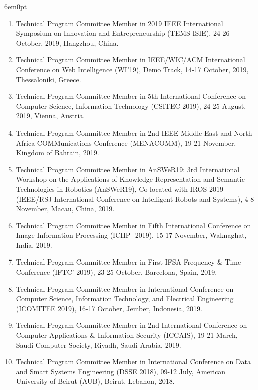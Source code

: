 \documentclass[11pt,a4paper]{moderncv}
\begin{document}
\begin{adjustwidth}{6em}{0pt}
\begin{enumerate}
		\item Technical Program Committee Member in 2019 IEEE International Symposium on Innovation and Entrepreneurship (TEMS-ISIE), 24-26 October, 2019, Hangzhou, China.
		
		\item Technical Program Committee Member in IEEE/WIC/ACM International Conference on Web Intelligence (WI'19), Demo Track, 14-17 October, 2019, Thessaloniki, Greece.
		
		\item Technical Program Committee Member in 5th International Conference on Computer Science, Information Technology (CSITEC 2019), 24-25 August, 2019, Vienna, Austria.
		
		\item Technical Program Committee Member in 2nd IEEE Middle East and North Africa COMMunications Conference (MENACOMM), 19-21 November, Kingdom of Bahrain, 2019.
		
		\item Technical Program Committee Member in AnSWeR19: 3rd International Workshop on the Applications of Knowledge Representation and Semantic Technologies in Robotics (AnSWeR19), Co-located with IROS 2019 (IEEE/RSJ International Conference on Intelligent Robots and Systems), 4-8 November, Macau, China, 2019.
		
		\item Technical Program Committee Member in Fifth International Conference on Image Information Processing (ICIIP -2019), 15-17 November, Waknaghat, India, 2019.
		
		\item Technical Program Committee Member in First IFSA Frequency \& Time Conference (IFTC' 2019), 23-25 October, Barcelona, Spain, 2019.
		
		\item Technical Program Committee Member in International Conference on Computer Science, Information Technology, and Electrical Engineering (ICOMITEE 2019), 16-17 October, Jember, Indonesia, 2019.
		
		\item Technical Program Committee Member in 2nd International Conference on Computer Applications \& Information Security (ICCAIS), 19-21 March, Saudi Computer Society, Riyadh, Saudi Arabia, 2019.
		
		\item Technical Program Committee Member in International Conference on Data and Smart Systems Engineering (DSSE 2018), 09-12 July, American University of Beirut (AUB), Beirut, Lebanon, 2018.
		

\end{enumerate}
\end{adjustwidth}
\end{document}

